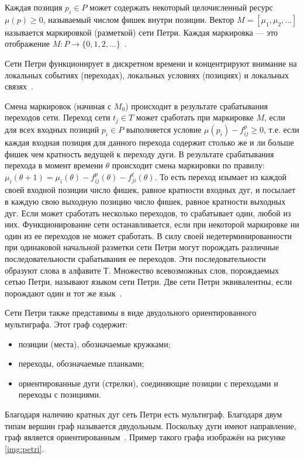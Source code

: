 Каждая позиция $p_i \in P$ может содержать некоторый целочисленный ресурс $\mu(p) \ge 0$, называемый числом фишек внутри позиции. Вектор $M = [\mu_1, \mu_2, \ldots]$ называется маркировкой (разметкой) сети Петри. Каждая маркировка --- это отображение $M: P \rightarrow \{0,1,2,\ldots\}$~\cite{petri}. 

Сети Петри функционирует в дискретном времени и концентрируют внимание на локальных событиях (переходах), локальных условиях (позициях) и локальных связях~\cite{petri}.

Смена маркировок (начиная с $M_0$) происходит в результате срабатывания переходов сети. Переход сети $t_j \in T$ может сработать при маркировке $M$, если для всех входных позиций $p_i \in P$ выполняется условие $\mu(p_i) - f_{ij}^p \ge 0$, т.е. если каждая входная позиция для данного перехода содержит столько же и ли больше фишек чем кратность ведущей к переходу дуги. В результате срабатывания перехода в момент времени $\theta$ происходит смена маркировки по правилу: $\mu_i(\theta + 1) = \mu_i(\theta) - f_{ij}^p(\theta) -  f_{ji}^t(\theta)$. То есть переход изымает из каждой своей входной позиции число фишек, равное кратности входных дуг, и посылает в каждую свою выходную позицию число фишек, равное кратности выходных дуг. Если может сработать несколько переходов, то срабатывает один, любой из них. Функционирование сети останавливается, если при некоторой маркировке ни один из ее переходов не может сработать. В силу своей недетерминированности при одинаковой начальной разметки сети Петри могут порождать различные последовательности срабатывания ее переходов. Эти последовательности образуют слова в алфавите Т. Множество всевозможных слов, порождаемых сетью Петри, называют языком сети Петри. Две сети Петри эквивалентны, если порождают один и тот же язык~\cite{petri}. 

Сети Петри также представимы в виде двудольного ориентированного мультиграфа. Этот граф содержит:
\begin{itemize}[label=---]
	\item позиции (места), обозначаемые кружками;
	\item переходы, обозначаемые планками;
	\item ориентированные дуги (стрелки), соединяющие позиции с переходами и переходы с позициями.
\end{itemize}
Благодаря наличию кратных дуг сеть Петри есть мультиграф. Благодаря двум типам вершин граф называется двудольным. Поскольку дуги имеют направление, граф является ориентированным~\cite{petri}. Пример такого графа изображён на рисунке \ref{img:petri}.

